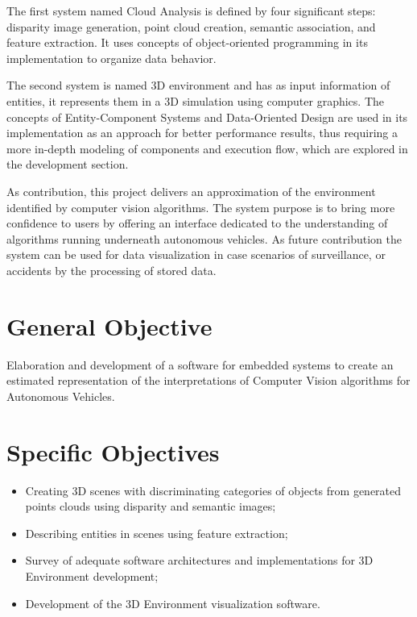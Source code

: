     The first system named Cloud Analysis is defined by four significant steps: disparity image generation, point cloud creation, semantic association, and feature extraction. It uses concepts of object-oriented programming \cite{object-oriented-modeling-and-design} in its implementation to organize data behavior.
    
    The second system is named 3D environment and has as input information of entities, it represents them in a 3D simulation using computer graphics. The concepts of Entity-Component Systems \cite{house-entity-component-explanation-stack} and Data-Oriented Design \cite{llopis-game-engine-gems-2} are used in its implementation as an approach for better performance results, thus requiring a more in-depth modeling of components and execution flow, which are explored in the development section.

    As contribution, this project delivers an approximation of the environment identified by computer vision algorithms. The system purpose is to bring more confidence to users by offering an interface dedicated to the understanding of algorithms running underneath autonomous vehicles. As future contribution the system can be used for data visualization in case scenarios of surveillance, or accidents by the processing of stored data. 

\section{General Objective}
    
    Elaboration and development of a software for embedded systems to create an estimated representation of the interpretations of Computer Vision algorithms for Autonomous Vehicles.
    
\section{Specific Objectives}

\begin{itemize}
    \item Creating 3D scenes with discriminating categories of objects from generated points clouds using disparity and semantic images;
    \item Describing entities in scenes using feature extraction;
    \item Survey of adequate software architectures and implementations for 3D Environment development;
    \item Development of the 3D Environment visualization software.
\end{itemize}
